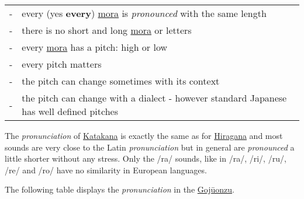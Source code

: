 \bigskip
\begin{tabular}{rl}
-&every (yes \textbf{every}) \hyperref[sec:Mora]{mora} is \textit{pronounced} 
  with the same length\\
-&there is no short and long \hyperref[sec:Mora]{mora} or letters\\
-&every \hyperref[sec:Mora]{mora} has a pitch: high or low\\
-&every pitch matters\\
-&the pitch can change  sometimes with its context\\
-&the pitch can change with a dialect - however standard Japanese has well 
  defined pitches\\
\end{tabular}

\bigskip

The \textit{pronunciation} of \hyperref[sec:Katakana]{Katakana} is exactly the
same as for \hyperref[sec:Hiragana]{Hiragana} and most sounds are very close to
the Latin \textit{pronunciation} but in general are \textit{pronounced} a
little shorter without any stress. Only the /ra/ sounds, like in /ra/, /ri/,
/ru/, /re/ and /ro/ have no similarity in European languages. 



The following table displays the \textit{pronunciation} in the
\hyperref[sec:Gojuonzu]{Gojūonzu}.





